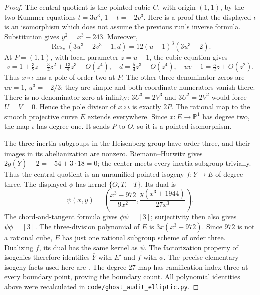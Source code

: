 \begin{proof}
The central quotient is the pointed cubic $C$, with origin $(1,1)$,
by the two Kummer equations $t=3u^3$, $1-t=-2v^3$. Here is a proof that
the displayed $\iota$ is an isomorphism which does not assume the
previous run's inverse formula. Substitution gives $y^2=x^3-243$.
Moreover,
\[
 \operatorname{Res}_v(3u^3-2v^3-1,d)
       =12(u-1)^3(3u^3+2).
\]
At $P=(1,1)$, with local parameter $z=u-1$, the cubic equation gives
\[
 v=1+\tfrac32z-\tfrac34z^2+\tfrac{13}{8}z^3+O(z^4),\quad
 d=\tfrac54z^3+O(z^4),\quad uv-1=\tfrac52z+O(z^2).
\]
Thus $x\circ\iota$ has a pole of order two at $P$.
The other three denominator zeros are $uv=1$, $u^3=-2/3$;
they are simple and both coordinate numerators vanish there.
There is no denominator zero at infinity: $3U^3=2V^3$ and
$3U^2=2V^2$ would force $U=V=0$. Hence the pole divisor of
$x\circ\iota$ is exactly $2P$. The rational map to the smooth
projective curve $E$ extends everywhere. Since $x:E\to\mathbb P^1$
has degree two, the map $\iota$ has degree one. It sends $P$ to
$O$, so it is a pointed isomorphism.

The three inertia subgroups in the Heisenberg group have order three,
and their images in its abelianization are nonzero. Riemann--Hurwitz
gives $2g(\overline Y)-2=-54+3\cdot18=0$; the center meets every
inertia subgroup trivially. Thus the central quotient is an unramified
pointed isogeny $f:\overline Y\to E$ of degree three.
The displayed $\phi$ has kernel $\{O,T,-T\}$. Its dual is
\[
 \psi(x,y)=\left(\frac{x^3-972}{9x^2},
                 \frac{y(x^3+1944)}{27x^3}\right).
\]
The chord-and-tangent formula gives $\phi\psi=[3]$; surjectivity
then also gives $\psi\phi=[3]$. The three-division polynomial of $E$
is $3x(x^3-972)$. Since $972$ is not a rational cube, $E$ has just
one rational subgroup scheme of order three. Dualizing $f$, its dual
has the same kernel as $\psi$. The factorization property of isogenies
therefore identifies $\overline Y$ with $E'$ and $f$ with $\phi$.
The precise elementary isogeny facts used here are
\citet[II.1.5--1.8, p.~49]{AuditMilneEC}. The degree-$27$ map has
ramification index three at every boundary point, proving the boundary
count. All polynomial identities above were recalculated in
\texttt{code/ghost\_audit\_elliptic.py}.


\end{proof}
